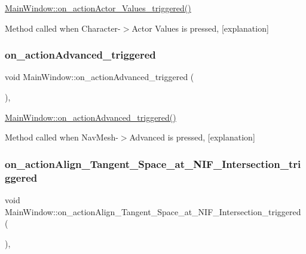 \hyperlink{class_main_window_a5aa38fdd3e3ea03f2fc2858d9110f2c6}{Main\+Window\+::on\+\_\+action\+Actor\+\_\+\+Values\+\_\+triggered()} 

Method called when Character-\/$>$Actor Values is pressed, \mbox{[}explanation\mbox{]} \mbox{\label{class_main_window_a5aa2fcd339d653b805dd629bc5ada6ea}} 
\subsubsection{\texorpdfstring{on\+\_\+action\+Advanced\+\_\+triggered}{on\_actionAdvanced\_triggered}}
{\footnotesize\ttfamily void Main\+Window\+::on\+\_\+action\+Advanced\+\_\+triggered (\begin{DoxyParamCaption}{ }\end{DoxyParamCaption})\hspace{0.3cm}{\ttfamily [private]}, {\ttfamily [slot]}}



\hyperlink{class_main_window_a5aa2fcd339d653b805dd629bc5ada6ea}{Main\+Window\+::on\+\_\+action\+Advanced\+\_\+triggered()} 

Method called when Nav\+Mesh-\/$>$Advanced is pressed, \mbox{[}explanation\mbox{]} \mbox{\label{class_main_window_a86bd042548f5e84c516b90d6d8b497ef}} 
\subsubsection{\texorpdfstring{on\+\_\+action\+Align\+\_\+\+Tangent\+\_\+\+Space\+\_\+at\+\_\+\+N\+I\+F\+\_\+\+Intersection\+\_\+triggered}{on\_actionAlign\_Tangent\_Space\_at\_NIF\_Intersection\_triggered}}
{\footnotesize\ttfamily void Main\+Window\+::on\+\_\+action\+Align\+\_\+\+Tangent\+\_\+\+Space\+\_\+at\+\_\+\+N\+I\+F\+\_\+\+Intersection\+\_\+triggered (\begin{DoxyParamCaption}{ }\end{DoxyParamCaption})\hspace{0.3cm}{\ttfamily [private]}, {\ttfamily [slot]}}



